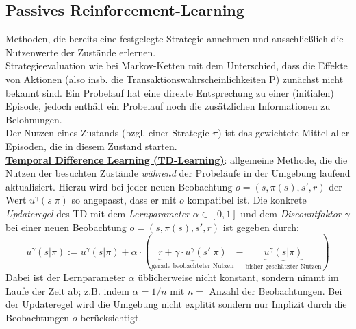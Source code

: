 \subsection{Passives Reinforcement-Learning}
\label{passivesRL}

Methoden, die bereits eine festgelegte Strategie annehmen und ausschließlich die Nutzenwerte der Zustände erlernen.\\

Strategieevaluation wie bei Markov-Ketten mit dem Unterschied, dass die Effekte von Aktionen (also insb. die Transaktionswahrscheinlichkeiten P) zunächst nicht bekannt sind. Ein Probelauf hat eine direkte Entsprechung zu einer (initialen) Episode, jedoch enthält ein Probelauf noch die zusätzlichen Informationen zu Belohnungen.\\

Der Nutzen eines Zustands (bzgl. einer Strategie $\pi$) ist das gewichtete Mittel aller Episoden, die in diesem Zustand starten.\\

\underline{\textbf{Temporal Difference Learning (TD-Learning)}}: allgemeine Methode, die die Nutzen der besuchten Zustände \emph{während} der Probeläufe in der Umgebung laufend aktualisiert. Hierzu wird bei jeder neuen Beobachtung $o=(s,\pi(s), s',r)$ der Wert $u^\gamma(s|\pi)$ so angepasst, dass er mit $o$ kompatibel ist. Die konkrete \emph{Updateregel} des TD mit dem \emph{Lernparameter} $\alpha\in[0,1]$ und dem \emph{Discountfaktor} $\gamma$ bei einer neuen Beobachtung $o=(s,\pi(s), s',r)$ ist gegeben durch:
\begin{equation*}
u^\gamma(s|\pi) := u^\gamma(s|\pi) + \alpha \cdot ( \underbrace{r + \gamma \cdot u^\gamma(s'|\pi)}_\text{gerade beobachteter Nutzen} - \underbrace{u^\gamma(s|\pi)}_\text{bisher geschätzter Nutzen} )
\end{equation*}
Dabei ist der Lernparameter $\alpha$ üblicherweise nicht konstant, sondern nimmt im Laufe der Zeit ab; z.B. indem $\alpha=1/n$ mit $n=$ Anzahl der Beobachtungen. Bei der Updateregel wird die Umgebung nicht explitit sondern nur Implizit durch die Beobachtungen $o$ berücksichtigt.\\
